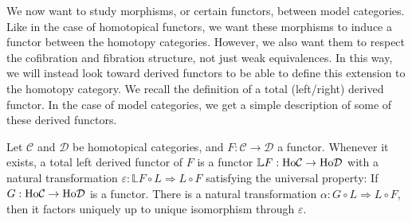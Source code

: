 \documentclass[../thesis.tex]{subfiles}
\begin{document}
            We now want to study morphisms, or certain functors, between model categories. Like in the case of homotopical functors, we want these morphisms to induce a functor between the homotopy categories. However, we also want them to respect the cofibration and fibration structure, not just weak equivalences. In this way, we will instead look toward derived functors to be able to define this extension to the homotopy category. We recall the definition of a total (left/right) derived functor. In the case of model categories, we get a simple description of some of these derived functors.

            \begin{definition}
                Let $\mathcal{C}$ and $\mathcal{D}$ be homotopical categories, and $F:\mathcal{C}\rightarrow\mathcal{D}$ a functor. Whenever it exists, a total left derived functor of $F$ is a functor $\mathbb{L}F:\tt{Ho}\mathcal{C}\rightarrow \tt{Ho}\mathcal{D}$ with a natural transformation $\varepsilon:\mathbb{L}F\circ L \Rightarrow L\circ F$ satisfying the universal property: If $G:\tt{Ho}\mathcal{C}\rightarrow \tt{Ho}\mathcal{D}$ is a functor. There is a natural transformation $\alpha: G\circ L \Rightarrow L\circ F$, then it factors uniquely up to unique isomorphism through $\varepsilon$.
                \begin{center}
                    \qquad
                \end{center}


\end{definition}
\end{document}
